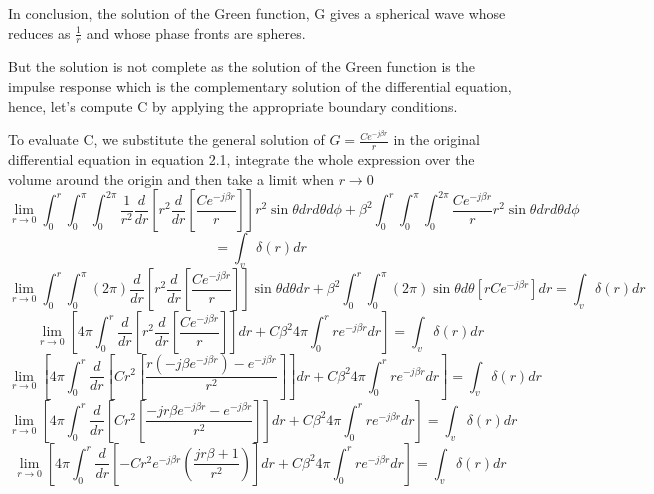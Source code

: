 In conclusion, the solution of the Green function, G gives a spherical wave whose  reduces as  $\frac{1}{r}$ and whose phase fronts are spheres.

But the solution is not complete as the solution of the Green function is the impulse response which is the complementary solution  of the differential equation, hence, let's compute C by applying the appropriate boundary conditions.

To evaluate C, we substitute the general solution of $G = \frac{Ce^{-j\beta r}}{r}$ in the original differential equation in equation 2.1, integrate the whole expression over the volume around the origin and then take a limit when $r\rightarrow0$
\begin{dmath*}
\lim\limits_{r\rightarrow0} \int_{0}^{r} \int_{0}^{\pi}\int_{0}^{2\pi}\frac{1}{r^{2}}\frac{d}{dr}\left[{r^{2}}\frac{d}{dr}\left[\frac{Ce^{-j\beta r}}{r}\right]\right]r^{2}\sin\theta dr d\theta d\phi + \beta^{2} \int_{0}^{r} \int_{0}^{\pi}\int_{0}^{2\pi}\frac{Ce^{-j\beta r}}{r}r^{2}\sin\theta drd\theta d\phi
\end{dmath*}
$$= \int_{v}\delta(r)dr$$
\begin{dmath*}
\lim\limits_{r\rightarrow0} \int_{0}^{r} \int_{0}^{\pi}(2\pi)\frac{d}{dr}\left[{r^{2}}\frac{d}{dr}\left[\frac{Ce^{-j\beta r}}{r}\right]\right]\sin\theta d\theta dr + \beta^{2} \int_{0}^{r} \int_{0}^{\pi}(2\pi)\sin\theta d\theta[rCe^{-j\beta r}]dr = \int_{v}\delta(r)dr
\end{dmath*}
\begin{dmath*}
\lim\limits_{r\rightarrow0} \left[4\pi\int_{0}^{r}\frac{d}{dr}\left[{r^{2}}\frac{d}{dr}\left[\frac{Ce^{-j\beta r}}{r}\right]\right]dr + C\beta^{2}4\pi\int_{0}^{r}re^{-j\beta r}dr\right] = \int_{v}\delta(r)dr
\end{dmath*}
\begin{dmath*}
\lim\limits_{r\rightarrow0} \left[4\pi\int_{0}^{r}\frac{d}{dr}\left[{Cr^{2}}\left[\frac{r(-j\beta e^{-j\beta r}) - e^{-j\beta r}}{r^{2}}\right]\right]dr + C\beta^{2}4\pi\int_{0}^{r}re^{-j\beta r}dr\right] = \int_{v}\delta(r)dr
\end{dmath*}
\begin{dmath*}
\lim\limits_{r\rightarrow0} \left[4\pi\int_{0}^{r}\frac{d}{dr}\left[{Cr^{2}}\left[\frac{-jr\beta e^{-j\beta r} - e^{-j\beta r}}{r^{2}}\right]\right]dr + C\beta^{2}4\pi\int_{0}^{r}re^{-j\beta r}dr\right] = \int_{v}\delta(r)dr
\end{dmath*}
\begin{dmath*}
\lim\limits_{r\rightarrow0} \left[4\pi\int_{0}^{r}\frac{d}{dr}\left[{-Cr^{2}} e^{-j\beta r}\left(\frac{jr\beta+1}{r^{2}}\right)\right]dr + C\beta^{2}4\pi\int_{0}^{r}re^{-j\beta r}dr\right] = \int_{v}\delta(r)dr
\end{dmath*}
